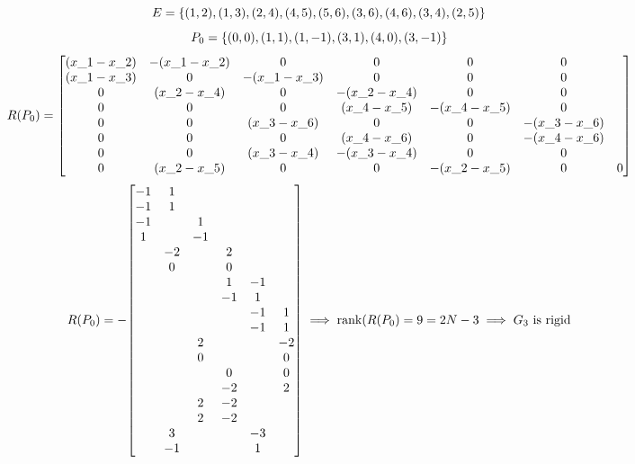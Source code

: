 \documentclass[]{article}
\numberwithin{equation}{section}
\begin{document}
\[
    E = \qty{
        (1,2),
        (1,3),
        (2,4),
        (4,5),
        (5,6),
        (3,6),
        (4,6),
        (3,4),
        (2,5)
    }
\]\[
    P_0 = \qty{
        ( 0, 0),
        ( 1, 1),
        ( 1,-1),
        ( 3, 1),
        ( 4, 0),
        ( 3,-1)
    }
\]\[
    R(P_0) = \mqty[
        (x\_1 - x\_2) & -(x\_1 - x\_2) & 0              & 0              & 0              & 0              \\
        (x\_1 - x\_3) & 0              & -(x\_1 - x\_3) & 0              & 0              & 0              \\
        0             & (x\_2 - x\_4)  & 0              & -(x\_2 - x\_4) & 0              & 0              \\
        0             & 0              & 0              & (x\_4 - x\_5)  & -(x\_4 - x\_5) & 0              \\
        0             & 0              & (x\_3 - x\_6)  & 0              & 0              & -(x\_3 - x\_6) \\
        0             & 0              & 0              & (x\_4 - x\_6)  & 0              & -(x\_4 - x\_6) \\
        0             & 0              & (x\_3 - x\_4)  & -(x\_3 - x\_4) & 0              & 0              \\
        0             & (x\_2 - x\_5)  & 0              & 0              & -(x\_2 - x\_5) & 0             & 0   
    ]
\]\[
    R(P_0) = -\mqty[
        -1 & 1  &    &    &    &    \\
        -1 & 1  &    &    &    &    \\
        -1 &    & 1  &    &    &    \\
        1  &    & -1 &    &    &    \\
        & -2 &    & 2  &    &    \\
        & 0  &    & 0  &    &    \\
        &    &    & 1  & -1 &    \\
        &    &    & -1 & 1  &    \\
        &    &    &    & -1 & 1  \\
        &    &    &    & -1 & 1  \\
        &    & 2  &    &    & -2 \\
        &    & 0  &    &    & 0  \\
        &    &    & 0  &    & 0  \\
        &    &    & -2 &    & 2  \\
        &    & 2  & -2 &    &    \\
        &    & 2  & -2 &    &    \\
        & 3  &    &    & -3 &    \\
        & -1 &    &    & 1  & 
    ] \implies \rank(R(P_0) = 9 = 2 N -3
    \implies G_3 \text{ is rigid}
\]
\end{document}
